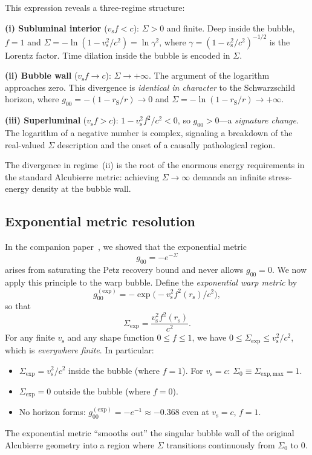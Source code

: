 \documentclass[prd,twocolumn,superscriptaddress,longbibliography]{revtex4-2}
\newcommand{\vs}{v_{\mathrm{s}}}
\newcommand{\rs}{r_{\mathrm{s}}}
\begin{document}
This expression reveals a three-regime structure:

\medskip
\noindent\textbf{(i) Subluminal interior} ($\vs f < c$): $\Sigma > 0$ and
finite.  Deep inside the bubble, $f = 1$ and
$\Sigma = -\ln(1 - \vs^2/c^2) = \ln\gamma^2$, where
$\gamma = (1 - \vs^2/c^2)^{-1/2}$ is the Lorentz factor.  Time
dilation inside the bubble is encoded in $\Sigma$.

\medskip
\noindent\textbf{(ii) Bubble wall} ($\vs f \to c$): $\Sigma \to +\infty$.
The argument of the logarithm approaches zero.  This divergence is
\emph{identical in character} to the Schwarzschild horizon, where
$g_{00} = -(1 - r_{\mathrm{S}}/r) \to 0$ and
$\Sigma = -\ln(1 - r_{\mathrm{S}}/r) \to +\infty$.

\medskip
\noindent\textbf{(iii) Superluminal} ($\vs f > c$):
$1 - \vs^2 f^2/c^2 < 0$, so $g_{00} > 0$---a \emph{signature change}.
The logarithm of a negative number is complex, signaling a breakdown
of the real-valued $\Sigma$ description and the onset of a causally
pathological region.

The divergence in regime~(ii) is the root of the enormous energy
requirements in the standard Alcubierre metric: achieving
$\Sigma \to \infty$ demands an infinite stress-energy density at the
bubble wall.

\subsection{Exponential metric resolution}

In the companion paper~\cite{Huang2026b}, we showed that
the exponential metric
\begin{equation}
\label{eq:exp_metric}
g_{00} = -e^{-\Sigma}
\end{equation}
arises from saturating the Petz recovery bound and never allows
$g_{00} = 0$.  We now apply this principle to the warp bubble.
Define the \emph{exponential warp metric} by
\begin{equation}
\label{eq:exp_warp}
g_{00}^{(\mathrm{exp})} = -\exp\!\bigl(-\vs^2 f^2(\rs)/c^2\bigr),
\end{equation}
so that
\begin{equation}
\label{eq:Sigma_exp}
\Sigma_{\mathrm{exp}} = \frac{\vs^2 f^2(\rs)}{c^2}.
\end{equation}
For any finite $\vs$ and any shape function $0 \leq f \leq 1$, we have
$0 \leq \Sigma_{\mathrm{exp}} \leq \vs^2/c^2$, which is
\emph{everywhere finite}.  In particular:
\begin{itemize}
\item $\Sigma_{\mathrm{exp}} = \vs^2/c^2$ inside the bubble (where $f = 1$).
For $\vs = c$: $\Sigma_0 \equiv \Sigma_{\mathrm{exp,max}} = 1$.
\item $\Sigma_{\mathrm{exp}} = 0$ outside the bubble (where $f = 0$).
\item No horizon forms: $g_{00}^{(\mathrm{exp})} = -e^{-1} \approx -0.368$
even at $\vs = c$, $f = 1$.
\end{itemize}
The exponential metric ``smooths out'' the singular bubble wall of
the original Alcubierre geometry into a region where
$\Sigma$ transitions continuously from $\Sigma_0$ to $0$.
\end{document}
